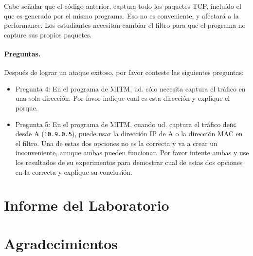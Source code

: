 Cabe señalar que el código anterior, captura todo los paquetes TCP, incluído el que es generado por el mismo programa. Eso no es conveniente, y afectará a la performance. Los estudiantes necesitan cambiar el filtro para que el programa no capture sus propios paquetes.

\paragraph{Preguntas.} Después de lograr un ataque exitoso, por favor conteste las siguientes preguntas:

\begin{itemize}
  \item Pregunta 4: En el programa de MITM, ud. sólo necesita captura el tráfico en una sola dirección. Por favor indique cual es esta dirección y explique el porque.

  \item Pregunta 5: En el programa de MITM, cuando ud. captura el tráfico de\texttt{nc} desde A (\texttt{10.9.0.5}), puede usar la dirección IP de A o la dirección MAC en el filtro. Una de estas dos opciones no es la correcta y va a crear un inconveniente, aunque ambas pueden funcionar. Por favor intente ambas y use los resultados de su experimentos para demostrar cual de estas dos opciones en la correcta y explique su conclusión.
\end{itemize}
 



\section{Informe del Laboratorio}




\section*{Agradecimientos}









